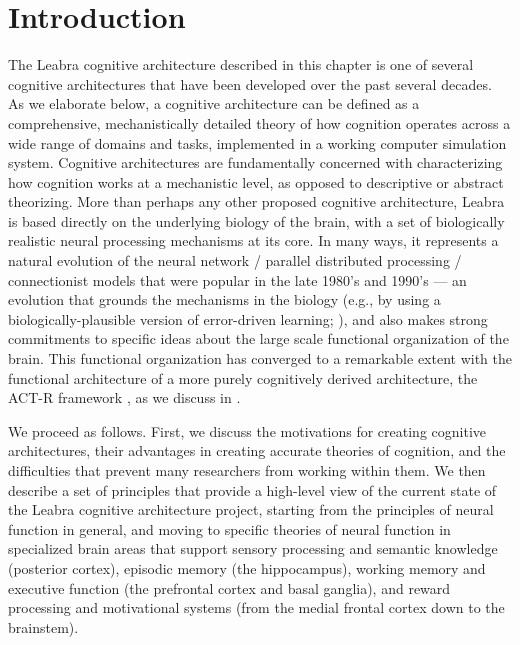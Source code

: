 \documentclass[11pt,twoside]{article}
\begin{document}



 
\titlesamepageoc{\mytitle}{\myauthor}{\mynote}{\myabstract}



\pagestyle{myheadings}

\section{Introduction}

The Leabra cognitive architecture described in this chapter is one of several
cognitive architectures that have been developed over the past several
decades.  As we elaborate below, a cognitive architecture can be defined as a
comprehensive, mechanistically detailed theory of how cognition operates
across a wide range of domains and tasks, implemented in a working
computer simulation system.  Cognitive architectures are fundamentally
concerned with characterizing how cognition works at a mechanistic level, as
opposed to descriptive or abstract theorizing.  More than perhaps any other
proposed cognitive architecture, Leabra is based directly on the underlying
biology of the brain, with a set of biologically realistic neural processing
mechanisms at its core.  In many ways, it represents a natural evolution of
the neural network / parallel distributed processing / connectionist models
that were popular in the late 1980's and 1990's --- an evolution that grounds
the mechanisms in the biology (e.g., by using a biologically-plausible version
of error-driven learning; ), and
also makes strong commitments to specific ideas about the large scale
functional organization of the brain.  This functional organization has
converged to a remarkable extent with the functional architecture of a more
purely cognitively derived architecture, the ACT-R framework
\cite{AndersonBothellByrneEtAl04}, as we discuss in .

We proceed as follows.  First, we discuss the motivations for creating
cognitive architectures, their advantages in creating accurate theories of
cognition, and the difficulties that prevent many researchers from working
within them.  We then describe a set of principles that provide a high-level
view of the current state of the Leabra cognitive architecture project,
starting from the principles of neural function in general, and moving to
specific theories of neural function in specialized brain areas that support
sensory processing and semantic knowledge (posterior cortex), episodic memory
(the hippocampus), working memory and executive function (the prefrontal
cortex and basal ganglia), and reward processing and motivational systems
(from the medial frontal cortex down to the brainstem).
\end{document}

